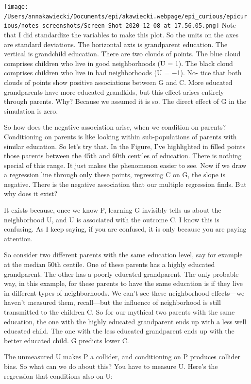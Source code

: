 \documentclass[
]{article}
\begin{document}
\texttt{[image: /Users/annakawiecki/Documents/epi/akawiecki.webpage/epi\_curious/epicurious/notes screenshots/Screen Shot 2020-12-08 at 17.56.05.png]}
Note that I did standardize the variables to make this plot. So the
units on the axes are standard deviations. The horizontal axis is
grandparent education. The vertical is grandchild education. There are
two clouds of points. The blue cloud comprises children who live in good
neighborhoods (U = 1). The black cloud comprises children who live in
bad neighborhoods (U = −1). No- tice that both clouds of points show
positive associations between G and C. More educated grandparents have
more educated grandkids, but this effect arises entirely through
parents. Why? Because we assumed it is so. The direct effect of G in the
simulation is zero.

So how does the negative association arise, when we condition on
parents? Conditioning on parents is like looking within sub-populations
of parents with similar education. So let's try that. In the Figure,
I've highlighted in filled points those parents between the 45th and
60th centiles of education. There is nothing special of this range. It
just makes the phenomenon easier to see. Now if we draw a regression
line through only these points, regressing C on G, the slope is
negative. There is the negative association that our multiple regression
finds. But why does it exist?

It exists because, once we know P, learning G invisibly tells us about
the neighborhood U, and U is associated with the outcome C. I know this
is confusing. As I keep saying, if you are confused, it is only because
you are paying attention.

So consider two different parents with the same education level, say for
example at the median 50th centile. One of these parents has a highly
educated grandparent. The other has a poorly educated grandparent. The
only probable way, in this example, for these parents to have the same
education is if they live in different types of neighborhoods. We can't
see these neighborhood effects---we haven't measured them, recall---but
the influence of neighborhood is still transmitted to the children C. So
for our mythical two parents with the same education, the one with the
highly educated grandparent ends up with a less well educated child. The
one with the less educated grandparent ends up with the better educated
child. G predicts lower C.

The unmeasured U makes P a collider, and conditioning on P produces
collider bias. So what can we do about this? You have to measure U.
Here's the regression that conditions also on U:
\end{document}
